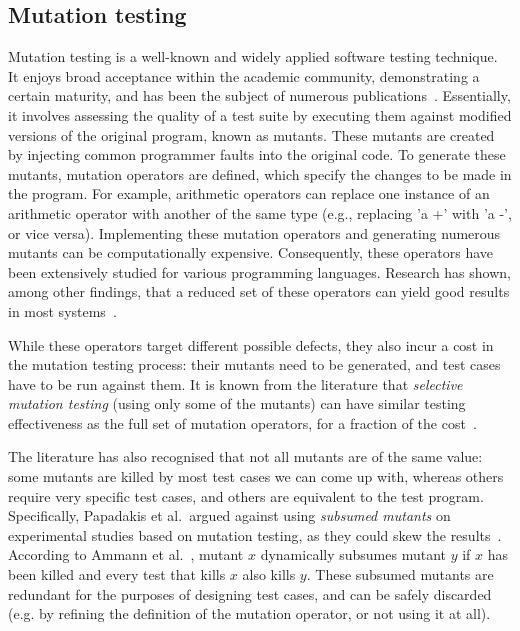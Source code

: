 \subsection{Mutation testing}
Mutation testing is a well-known and widely applied software testing technique. It enjoys broad acceptance within the academic community, demonstrating a certain maturity, and has been the subject of numerous publications~\cite{parsai2literature, PAPADAKIS2019275}. Essentially, it involves assessing the quality of a test suite by executing them against modified versions of the original program, known as mutants. These mutants are created by injecting common programmer faults into the original code. To generate these mutants, mutation operators are defined, which specify the changes to be made in the program. For example, arithmetic operators can replace one instance of an arithmetic operator with another of the same type (e.g., replacing 'a +' with 'a -', or vice versa). Implementing these mutation operators and generating numerous mutants can be computationally expensive. Consequently, these operators have been extensively studied for various programming languages. Research has shown, among other findings, that a reduced set of these operators can yield good results in most systems~\cite{Offutt96OpMut}.

While these operators target different possible defects, they also incur a cost in the mutation testing process: their mutants need to be generated, and test cases have to be run against them. It is known from the literature that \emph{selective mutation testing} (using only some of the mutants) can have similar testing effectiveness as the full set of mutation operators, for a fraction of the cost~\cite{Mresa99OpMut}.

The literature has also recognised that not all mutants are of the same value: some mutants are killed by most test cases we can come up with, whereas others require very specific test cases, and others are equivalent to the test program. Specifically, Papadakis et al.\ argued against using \emph{subsumed mutants} on experimental studies based on mutation testing, as they could skew the results~\cite{papadakis_threats_2016}. According to Ammann et al.~\cite{ammann_establishing_2014}, mutant $x$ dynamically subsumes mutant $y$ if $x$ has been killed and every test that kills $x$ also kills $y$. These subsumed mutants are redundant for the purposes of designing test cases, and can be safely discarded (e.g. by refining the definition of the mutation operator, or not using it at all).


